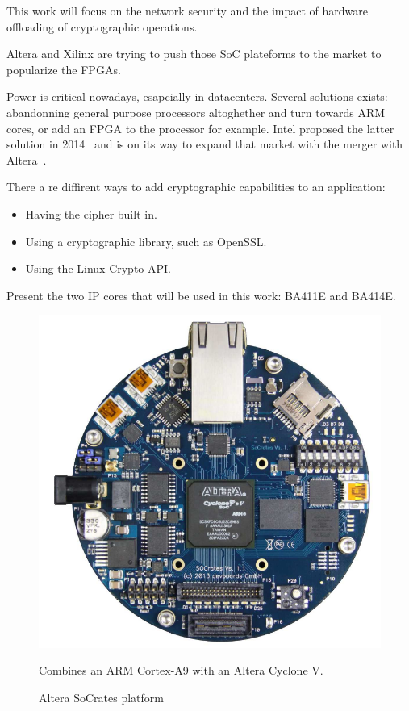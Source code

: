 This work will focus on the network security and the impact of hardware offloading of cryptographic operations.

Altera and Xilinx are trying to push those SoC plateforms to the market to popularize the FPGAs.

Power is critical nowadays, esapcially in datacenters.
Several solutions exists: abandonning general purpose processors altoghether and turn towards ARM cores, or add an FPGA to the processor for example.
Intel proposed the latter solution in 2014~\cite{intel-xeon-fpga} and is on its way to expand that market with the merger with Altera~\cite{2015-intel-altera-merger}.

There a re diffirent ways to add cryptographic capabilities to an application:
\begin{itemize}
	\item Having the cipher built in.
	\item Using a cryptographic library, such as OpenSSL.
	\item Using the Linux Crypto API.
\end{itemize}

Present the two IP cores that will be used in this work: BA411E and BA414E.

\begin{figure}[ht]
\includegraphics[width=\linewidth]{socrates-photo}
\caption{Altera SoCrates platform}{Combines an ARM Cortex-A9 with an Altera Cyclone V.}
\label{socrates-photo}
\end{figure}





